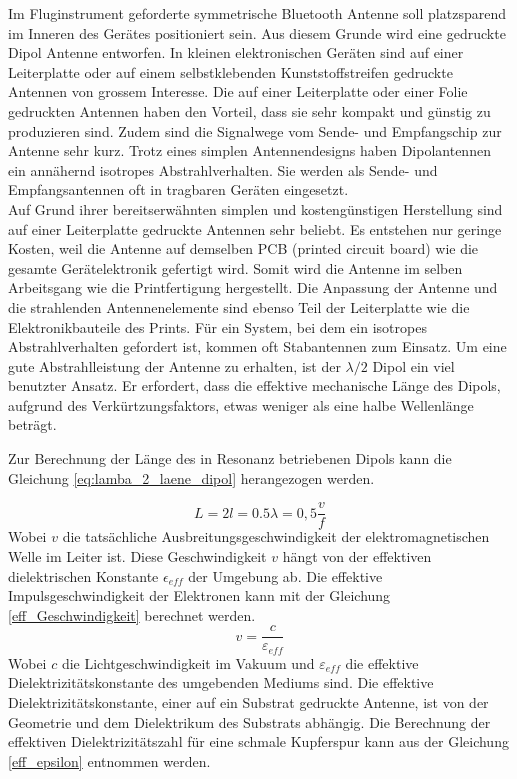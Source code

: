 Im Fluginstrument geforderte symmetrische Bluetooth Antenne soll platzsparend im Inneren des Gerätes positioniert sein. Aus diesem Grunde wird eine gedruckte Dipol Antenne entworfen. In kleinen elektronischen Geräten sind auf einer Leiterplatte oder auf einem selbstklebenden Kunststoffstreifen gedruckte Antennen von grossem Interesse. Die auf einer Leiterplatte oder einer Folie gedruckten Antennen haben den Vorteil, dass sie sehr kompakt und günstig zu produzieren sind. Zudem sind die Signalwege vom Sende- und Empfangschip zur Antenne sehr kurz. Trotz eines simplen Antennendesigns haben Dipolantennen ein annähernd isotropes Abstrahlverhalten. Sie werden als Sende- und Empfangsantennen oft in  tragbaren Geräten eingesetzt. \\

Auf Grund ihrer bereitserwähnten simplen und kostengünstigen Herstellung sind auf einer Leiterplatte gedruckte Antennen sehr beliebt. Es entstehen nur geringe Kosten, weil die Antenne auf demselben PCB (printed circuit board) wie die gesamte Gerätelektronik gefertigt wird. Somit wird die Antenne im selben Arbeitsgang wie die Printfertigung hergestellt. Die  Anpassung der Antenne und die strahlenden Antennenelemente sind ebenso Teil der Leiterplatte wie die Elektronikbauteile des Prints. Für ein System, bei dem ein isotropes Abstrahlverhalten gefordert ist, kommen oft Stabantennen zum Einsatz. Um eine gute Abstrahlleistung der Antenne zu erhalten, ist der $\lambda /2$ Dipol ein viel benutzter Ansatz. Er erfordert, dass die effektive mechanische Länge des Dipols, aufgrund des Verkürtzungsfaktors, etwas weniger als eine halbe Wellenlänge beträgt. 
 
Zur Berechnung der Länge des in Resonanz betriebenen Dipols kann die  Gleichung \ref{eq:lamba_2_laene_dipol} herangezogen werden.

\begin{equation}\label{eq:lamba_2_laene_dipol}
L=2l = 0.5 \lambda= 0,5 \dfrac{v}{f}
\end{equation} 
Wobei $v$ die tatsächliche Ausbreitungsgeschwindigkeit der elektromagnetischen Welle im Leiter ist. Diese Geschwindigkeit $v$ hängt von der effektiven dielektrischen Konstante $\epsilon_{eff}$ der Umgebung  ab. 
Die effektive  Impulsgeschwindigkeit der Elektronen kann mit der Gleichung \ref{eff_Geschwindigkeit} berechnet werden. 
\begin{equation}\label{eff_Geschwindigkeit}
v = \dfrac{c}{\varepsilon_{eff}}
\end{equation}
Wobei $c$ die Lichtgeschwindigkeit im Vakuum und $\varepsilon_{eff}$  die effektive Dielektrizitätskonstante des umgebenden Mediums sind. Die effektive Dielektrizitätskonstante, einer auf ein Substrat gedruckte Antenne, ist von der  Geometrie und dem Dielektrikum des Substrats abhängig. Die Berechnung der effektiven Dielektrizitätszahl für eine schmale Kupferspur kann aus der Gleichung \ref{eff_epsilon} entnommen werden. 

